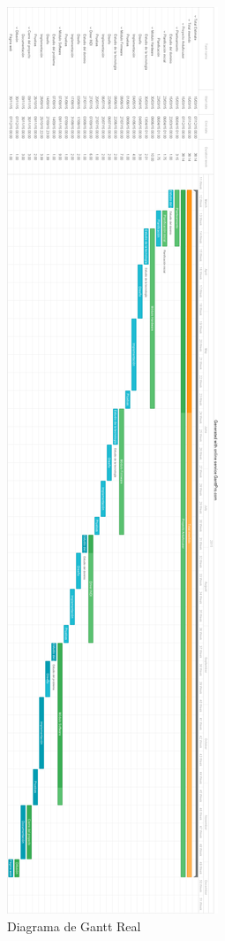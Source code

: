 \begin{figure}[h]
\centering
\includegraphics[width=0.41\linewidth]{../images/gantt_inicial}
\caption{Diagrama de Gantt Real}
\label{gantt_final}
\end{figure}